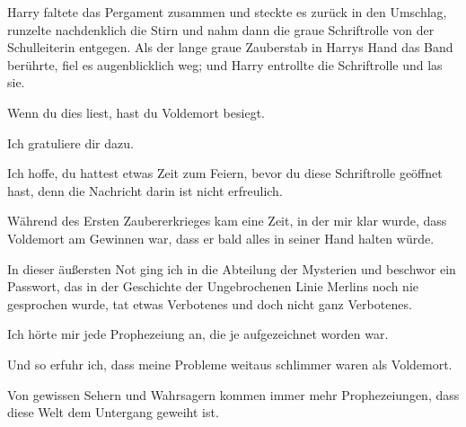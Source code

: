 \later

Harry faltete das Pergament zusammen und steckte es zurück in den Umschlag, runzelte nachdenklich die Stirn und nahm dann die graue Schriftrolle von der Schulleiterin entgegen. Als der lange graue Zauberstab in Harrys Hand das Band berührte, fiel es augenblicklich weg; und Harry entrollte die Schriftrolle und las sie.

\later

\begin{writtenNote}
Wenn du dies liest, hast du Voldemort besiegt.

Ich gratuliere dir dazu.

Ich hoffe, du hattest etwas Zeit zum Feiern, bevor du diese Schriftrolle geöffnet hast, denn die Nachricht darin ist nicht erfreulich.

Während des Ersten Zaubererkrieges kam eine Zeit, in der mir klar wurde, dass Voldemort am Gewinnen war, dass er bald alles in seiner Hand halten würde.

In dieser äußersten Not ging ich in die Abteilung der Mysterien und beschwor ein Passwort, das in der Geschichte der Ungebrochenen Linie Merlins noch nie gesprochen wurde, tat etwas Verbotenes und doch nicht ganz Verbotenes.

Ich hörte mir jede Prophezeiung an, die je aufgezeichnet worden war.

Und so erfuhr ich, dass meine Probleme weitaus schlimmer waren als Voldemort.

Von gewissen Sehern und Wahrsagern kommen immer mehr Prophezeiungen, dass diese Welt dem Untergang geweiht ist.


\end{writtenNote}

